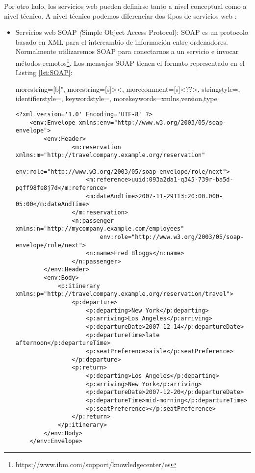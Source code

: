 Por otro lado, los servicios web pueden definirse tanto a nivel conceptual como a nivel técnico. A nivel técnico podemos diferenciar dos tipos de servicios web \citep{TorresJoaquin2017SC}:
\begin{itemize}
	\item Servicios web SOAP \textit({Simple Object Access Protocol}): SOAP es un protocolo basado en XML para el intercambio de información entre ordenadores. Normalmente utilizaremos SOAP para conectarnos a un servicio e invocar métodos remotos\footnote{https://www.ibm.com/support/knowledgecenter/es}. Los mensajes SOAP tienen el formato representado en el Listing \ref{lst:SOAP}:

	
	
	
	
	{
		morestring=[b]",
		morestring=[s]{>}{<},
		morecomment=[s]{<?}{?>},
		stringstyle=\color{black},
		identifierstyle=\color{darkblue},
		keywordstyle=\color{purple},
		morekeywords={xmlns,version,type}%
	}
	
	
	\lstset{language=XML}
	\begin{lstlisting}[caption= Estructura de un mensaje SOAP, label={lst:SOAP}, frame=single]
	<?xml version='1.0' Encoding='UTF-8' ?>
	<env:Envelope xmlns:env="http://www.w3.org/2003/05/soap-envelope"> 
		<env:Header>
				<m:reservation xmlns:m="http://travelcompany.example.org/reservation" 
							env:role="http://www.w3.org/2003/05/soap-envelope/role/next">
					<m:reference>uuid:093a2da1-q345-739r-ba5d-pqff98fe8j7d</m:reference>
					<m:dateAndTime>2007-11-29T13:20:00.000-05:00</m:dateAndTime>
				</m:reservation>
				<n:passenger xmlns:n="http://mycompany.example.com/employees" 
						env:role="http://www.w3.org/2003/05/soap-envelope/role/next">
					<n:name>Fred Bloggs</n:name>
				</n:passenger>
		</env:Header>
		<env:Body>
			<p:itinerary xmlns:p="http://travelcompany.example.org/reservation/travel">
				<p:departure>
					<p:departing>New York</p:departing>
					<p:arriving>Los Angeles</p:arriving>
					<p:departureDate>2007-12-14</p:departureDate>
					<p:departureTime>late afternoon</p:departureTime>
					<p:seatPreference>aisle</p:seatPreference>
				</p:departure>
				<p:return>
					<p:departing>Los Angeles</p:departing>
					<p:arriving>New York</p:arriving>
					<p:departureDate>2007-12-20</p:departureDate>
					<p:departureTime>mid-morning</p:departureTime>
					<p:seatPreference></p:seatPreference>
				</p:return>
			</p:itinerary>
		</env:Body>
	</env:Envelope>
	\end{lstlisting}
	

\end{itemize}
